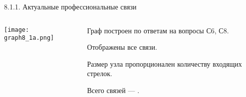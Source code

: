 \begin{frame}{8.1.1. Актуальные профессиональные связи}

\begin{columns} 
\begin{column}{0.75\textwidth} 
\centering
          \texttt{[image: graph8\_1a.png]}
\end{column}
\begin{column}{0.25\textwidth} 

\tiny
Граф построен по ответам на вопросы С6, С8.
\smallskip

Отображены все связи. 
\smallskip

Размер узла пропорционален количеству входящих стрелок.
\bigskip

Всего связей --- \valHAAlinks.

\end{column}
\end{columns}
\end{frame}


